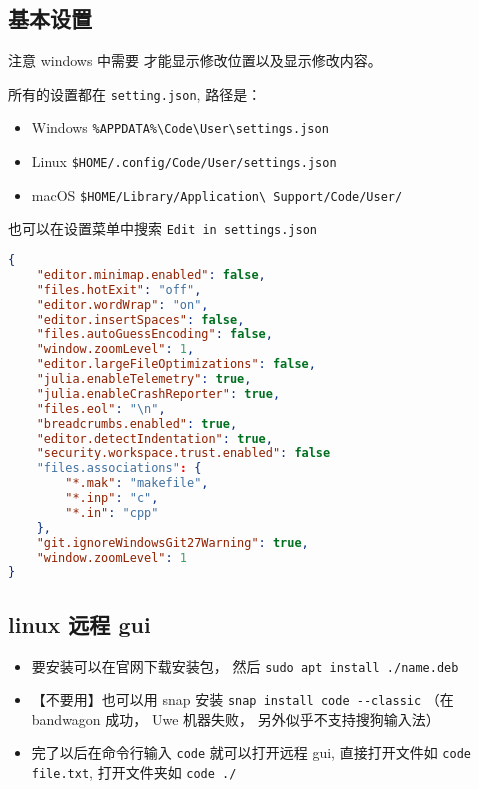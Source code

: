 

\subsection{基本设置}

注意 windows 中需要  才能显示修改位置以及显示修改内容。

所有的设置都在 \verb`setting.json`, 路径是：
\begin{itemize}
\item Windows \verb`%APPDATA%\Code\User\settings.json`
\item Linux \verb`$HOME/.config/Code/User/settings.json`
\item macOS \verb`$HOME/Library/Application\ Support/Code/User/`
\end{itemize}

也可以在设置菜单中搜索 \verb`Edit in settings.json`

\begin{lstlisting}[language=json,caption=settings.json]
{
	"editor.minimap.enabled": false,
	"files.hotExit": "off",
	"editor.wordWrap": "on",
    "editor.insertSpaces": false,
	"files.autoGuessEncoding": false,
	"window.zoomLevel": 1,
	"editor.largeFileOptimizations": false,
	"julia.enableTelemetry": true,
	"julia.enableCrashReporter": true,
	"files.eol": "\n",
	"breadcrumbs.enabled": true,
	"editor.detectIndentation": true,
	"security.workspace.trust.enabled": false
	"files.associations": {
		"*.mak": "makefile",
		"*.inp": "c",
		"*.in": "cpp"
	},
	"git.ignoreWindowsGit27Warning": true,
	"window.zoomLevel": 1
}
\end{lstlisting}


\subsection{linux 远程 gui}
\begin{itemize}
\item 要安装可以在官网下载安装包， 然后 \verb`sudo apt install ./name.deb`
\item 【不要用】也可以用 snap 安装 \verb`snap install code --classic` （在 bandwagon 成功， Uwe 机器失败， 另外似乎不支持搜狗输入法）
\item 完了以后在命令行输入 \verb`code` 就可以打开远程 gui, 直接打开文件如 \verb`code file.txt`, 打开文件夹如 \verb`code ./`
\end{itemize}
